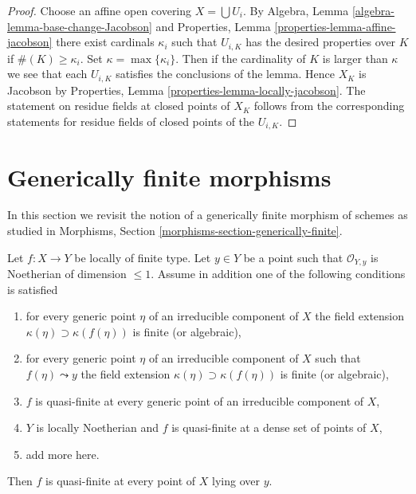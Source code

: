 \begin{proof}
Choose an affine open covering $X = \bigcup U_i$.
By
Algebra, Lemma \ref{algebra-lemma-base-change-Jacobson}
and
Properties, Lemma \ref{properties-lemma-affine-jacobson}
there exist cardinals $\kappa_i$ such that $U_{i, K}$ has
the desired properties over $K$ if $\#(K) \geq \kappa_i$.
Set $\kappa = \max\{\kappa_i\}$. Then if the cardinality of
$K$ is larger than $\kappa$ we see that each $U_{i, K}$ satisfies
the conclusions of the lemma. Hence $X_K$ is Jacobson by
Properties, Lemma \ref{properties-lemma-locally-jacobson}.
The statement on residue fields at closed points of $X_K$
follows from the corresponding
statements for residue fields of closed points of the $U_{i, K}$.
\end{proof}




\section{Generically finite morphisms}
\label{section-generically-finite}

\noindent
In this section we revisit the notion of a generically finite
morphism of schemes as studied in
Morphisms, Section \ref{morphisms-section-generically-finite}.

\begin{lemma}
\label{lemma-quasi-finite-in-codim-1}
Let $f : X \to Y$ be locally of finite type. Let $y \in Y$ be a point
such that $\mathcal{O}_{Y, y}$ is Noetherian of dimension $\leq 1$.
Assume in addition one of the following conditions is satisfied
\begin{enumerate}
\item for every generic point $\eta$ of an irreducible component
of $X$ the field extension $\kappa(\eta) \supset \kappa(f(\eta))$
is finite (or algebraic),
\item for every generic point $\eta$ of an irreducible component
of $X$ such that $f(\eta) \leadsto y$ the field extension
$\kappa(\eta) \supset \kappa(f(\eta))$ is finite (or algebraic),
\item $f$ is quasi-finite at every generic point of an
irreducible component of $X$,
\item $Y$ is locally Noetherian and $f$
is quasi-finite at a dense set of points of $X$,
\item add more here.
\end{enumerate}
Then $f$ is quasi-finite at every point of $X$ lying over $y$.
\end{lemma}

